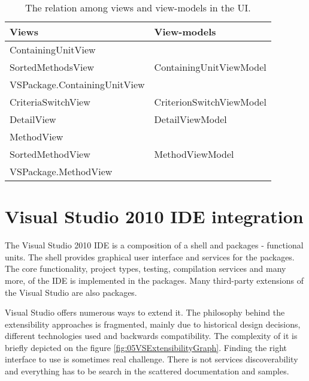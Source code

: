 \begin{table}
\centering
    \begin{tabular}{|l|l|}
        \hline
        \textbf{Views}                                                      & \textbf{View-models }    \\ \hline
        ContainingUnitView 													&       				   \\ 
        SortedMethodsView 													& ContainingUnitViewModel  \\ 
        VSPackage.ContainingUnitView 										&   					   \\ \hline
        CriteriaSwitchView                                                  & CriterionSwitchViewModel \\ \hline
        DetailView                                                          & DetailViewModel          \\ \hline
        MethodView										                    &                          \\
        SortedMethodView								                    & MethodViewModel          \\
        VSPackage.MethodView                                                &                          \\ \hline
    \end{tabular}
    \caption{The relation among views and view-models in the UI.}
   	\label{tab:05viewviewmodels}
    	
\end{table}


\section{Visual Studio 2010 IDE integration}
The Visual Studio 2010 IDE is a composition of a shell and packages - functional units. The shell provides graphical user interface and services for the packages. The core functionality, project types, testing, compilation services and many more, of the IDE is implemented in the packages. Many third-party extensions of the Visual Studio are also packages.

Visual Studio offers numerous ways to extend it. The philosophy behind the extensibility approaches is fragmented, mainly due to historical design decisions, different technologies used and backwards compatibility. The complexity of it is briefly depicted on the figure \ref{fig:05VSExtensibilityGraph}. Finding the right interface to use is sometimes real challenge. There is not services discoverability and everything has to be search in the scattered documentation and samples.


